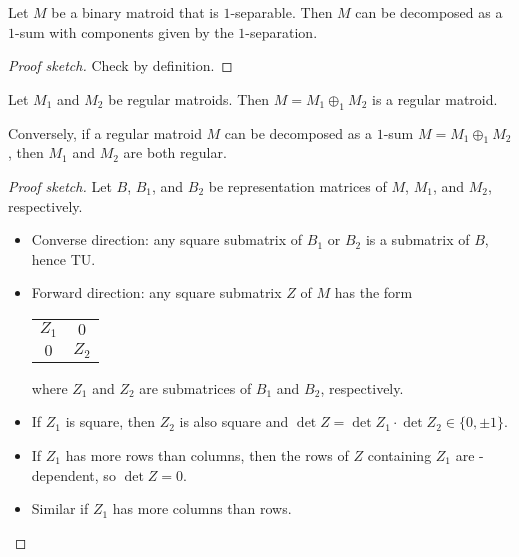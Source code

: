 \begin{lemma}
  \label{lem:code_1_sep_yields_1_sum}
  Let $M$ be a binary matroid that is $1$-separable.
  Then $M$ can be decomposed as a $1$-sum with components given by the $1$-separation.
\end{lemma}

\begin{proof}[Proof sketch]
  Check by definition.
\end{proof}

\begin{lemma}
  \label{lem:code_1_sum_of_regular}
  Let $M_{1}$ and $M_{2}$ be regular matroids. Then $M = M_{1} \oplus_{1} M_{2}$ is a regular matroid.

  Conversely, if a regular matroid $M$ can be decomposed as a $1$-sum $M = M_{1} \oplus_{1} M_{2}$, then $M_{1}$ and $M_{2}$ are both regular.
\end{lemma}

\begin{proof}[Proof sketch]
  Let $B$, $B_{1}$, and $B_{2}$ be representation matrices of $M$, $M_{1}$, and $M_{2}$, respectively.
  \begin{itemize}
    \item Converse direction: any square submatrix of $B_{1}$ or $B_{2}$ is a submatrix of $B$, hence TU.
    \item Forward direction: any square submatrix $Z$ of $M$ has the form
    \begin{tabular}{cc}
      \cline{1-2}
      \multicolumn{1}{|c|}{$Z_{1}$} & \multicolumn{1}{c|}{    $0$} \\ \cline{1-2}
      \multicolumn{1}{|c|}{    $0$} & \multicolumn{1}{c|}{$Z_{2}$} \\ \cline{1-2}
    \end{tabular}
    where $Z_{1}$ and $Z_{2}$ are submatrices of $B_{1}$ and $B_{2}$, respectively.
    \item If $Z_{1}$ is square, then $Z_{2}$ is also square and $\det Z = \det Z_{1} \cdot \det Z_{2} \in \{0, \pm 1\}$.
    \item If $Z_{1}$ has more rows than columns, then the rows of $Z$ containing $Z_{1}$ are \GFtwo-dependent, so $\det Z = 0$.
    \item Similar if $Z_{1}$ has more columns than rows.
  \end{itemize}
\end{proof}


